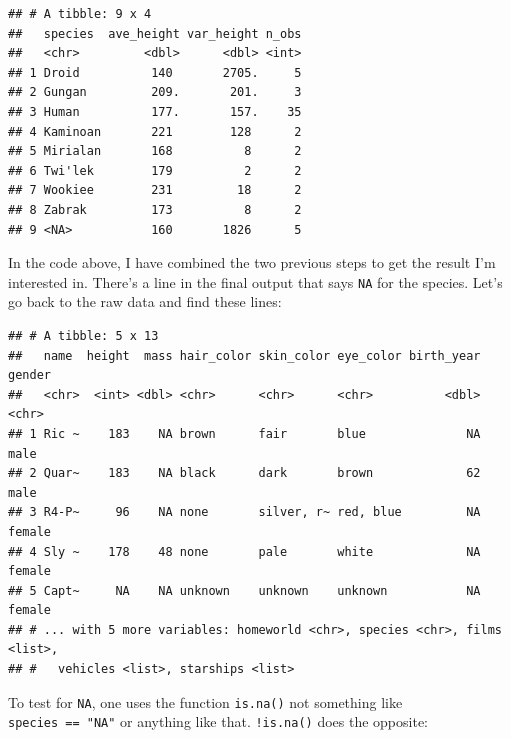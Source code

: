 \documentclass[]{gitbook}
\newenvironment{Shaded}{\begin{snugshade}}{\end{snugshade}}
\newcommand{\KeywordTok}[1]{\textcolor[rgb]{0.13,0.29,0.53}{\textbf{#1}}}
\newcommand{\NormalTok}[1]{#1}
\newcommand{\OperatorTok}[1]{\textcolor[rgb]{0.81,0.36,0.00}{\textbf{#1}}}
\newcommand{\StringTok}[1]{\textcolor[rgb]{0.31,0.60,0.02}{#1}}
\theoremstyle{definition}
\theoremstyle{definition}
\theoremstyle{definition}
\theoremstyle{remark}
\begin{document}
\begin{verbatim}
## # A tibble: 9 x 4
##   species  ave_height var_height n_obs
##   <chr>         <dbl>      <dbl> <int>
## 1 Droid          140       2705.     5
## 2 Gungan         209.       201.     3
## 3 Human          177.       157.    35
## 4 Kaminoan       221        128      2
## 5 Mirialan       168          8      2
## 6 Twi'lek        179          2      2
## 7 Wookiee        231         18      2
## 8 Zabrak         173          8      2
## 9 <NA>           160       1826      5
\end{verbatim}

In the code above, I have combined the two previous steps to get the
result I'm interested in. There's a line in the final output that says
\texttt{NA} for the species. Let's go back to the raw data and find
these lines:

\begin{Shaded}
\end{Shaded}

\begin{verbatim}
## # A tibble: 5 x 13
##   name  height  mass hair_color skin_color eye_color birth_year gender
##   <chr>  <int> <dbl> <chr>      <chr>      <chr>          <dbl> <chr> 
## 1 Ric ~    183    NA brown      fair       blue              NA male  
## 2 Quar~    183    NA black      dark       brown             62 male  
## 3 R4-P~     96    NA none       silver, r~ red, blue         NA female
## 4 Sly ~    178    48 none       pale       white             NA female
## 5 Capt~     NA    NA unknown    unknown    unknown           NA female
## # ... with 5 more variables: homeworld <chr>, species <chr>, films <list>,
## #   vehicles <list>, starships <list>
\end{verbatim}

To test for \texttt{NA}, one uses the function \texttt{is.na()} not
something like \texttt{species\ ==\ "NA"} or anything like that.
\texttt{!is.na()} does the opposite:

\begin{Shaded}
\end{Shaded}
\end{document}
